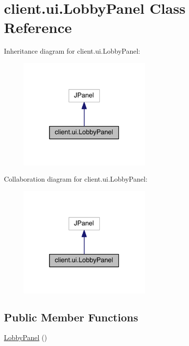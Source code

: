 \hypertarget{classclient_1_1ui_1_1_lobby_panel}{}\section{client.\+ui.\+Lobby\+Panel Class Reference}
\label{classclient_1_1ui_1_1_lobby_panel}


Inheritance diagram for client.\+ui.\+Lobby\+Panel\+:
\nopagebreak
\begin{figure}[H]
\begin{center}
\leavevmode
\includegraphics[width=186pt]{classclient_1_1ui_1_1_lobby_panel__inherit__graph}
\end{center}
\end{figure}


Collaboration diagram for client.\+ui.\+Lobby\+Panel\+:
\nopagebreak
\begin{figure}[H]
\begin{center}
\leavevmode
\includegraphics[width=186pt]{classclient_1_1ui_1_1_lobby_panel__coll__graph}
\end{center}
\end{figure}
\subsection*{Public Member Functions}
\begin{DoxyCompactItemize}
\item 
\hyperlink{classclient_1_1ui_1_1_lobby_panel_aa6432c40dfb52b11101ab3e1e7fbb30c}{Lobby\+Panel} ()
\end{DoxyCompactItemize}


